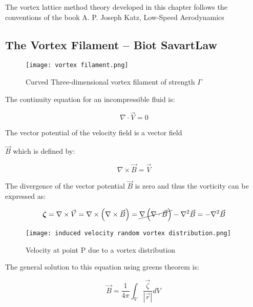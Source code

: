 The vortex lattice method theory developed in this chapter follows the
conventions of the book A. P. Joseph Katz, Low-Speed Aerodynamics \cite{katz2001}




\subsection{The Vortex Filament -- Biot SavartLaw}
\label{the-vortex-filament-biot-savart-law}

\begin{figure}[H]
    \centering
    \texttt{[image: vortex filament.png]}
    \caption{Curved Three-dimensional vortex filament of strength $\Gamma$ \cite{pinzon2015}}
\end{figure}

The continuity equation for an incompressible fluid is:

\begin{equation}
\nabla \cdot \vec{V} = 0
\end{equation}

The vector potential of the velocity field is a vector field

$\vec{B}$ which is defined by:

\begin{equation}
\nabla \times \vec{B} = \vec{V}
\end{equation}

The divergence of the vector potential $\vec{B}$ is zero
and thus the vorticity can be expressed as:

\begin{equation}
\boldsymbol{\zeta} = \nabla \times \vec{V} = \nabla \times \left( \nabla \times \vec{B} \right) = \cancel{\nabla\left( \nabla \cdot \vec{B} \right)} - \nabla^{2}\vec{B} = - \nabla^{2}\vec{B}
\end{equation}

\begin{figure}[H]
    \centering
    \texttt{[image: induced velocity random vortex distribution.png]}
    \caption{Velocity at point P due to a vortex distribution \cite{katz2001}}
\end{figure}

The general solution to this equation using greens theorem is:

\begin{equation}
    \label{eq:vortexvelocity}
\vec{B} = \frac{1}{4\pi}\int_{V}^{}{\frac{\vec{\zeta}}{\left| \vec{r} \right|}dV\ }
\end{equation}

